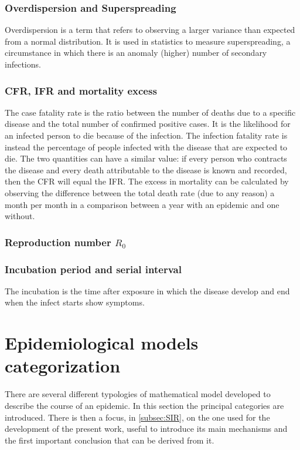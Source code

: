 \subsubsection{Overdispersion and Superspreading} Overdispersion is a term that refers to observing a larger variance than expected from a normal distribution. It is used in statistics to measure superspreading, a circumstance in which there is an anomaly (higher) number of secondary infections.

\subsubsection{CFR, IFR and mortality excess} The case fatality rate is the ratio between the number of deaths due to a specific disease and the total number of confirmed positive cases. It is the likelihood for an infected person to die because of the infection. The infection fatality rate is instead the percentage of people infected with the disease that are expected to die. The two quantities can have a similar value: if every person who contracts the disease and every death attributable to the disease is known and recorded, then the CFR will equal the IFR.
The excess in mortality can be calculated by observing the difference between the total death rate (due to any reason) a month per month in a comparison between a year with an epidemic and one without. 

\subsubsection{Reproduction number $R_0$}

\subsubsection{Incubation period and serial interval} The incubation is the time after exposure in which the disease develop and end when the infect starts show symptoms. 

\section{Epidemiological models categorization }
There are several different typologies of mathematical model developed to describe the course of an epidemic. In this section the principal categories are introduced. There is then a focus, in \ref{subsec:SIR}, on the one used for the development of the present work, useful to introduce its main mechanisms and the first important conclusion that can be derived from it. 

